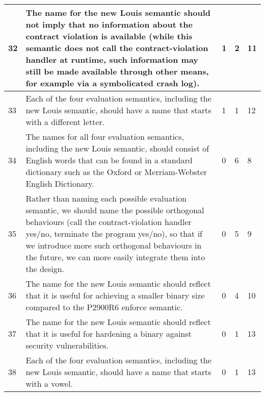 \begin{longtable}{|p{0.8cm}|p{11.5cm}|p{0.6cm}|p{0.6cm}|p{0.6cm}|}
32 & The name for the new Louis semantic should not imply that no information about the contract violation is available (while this semantic does not call the contract-violation handler at runtime, such information may still be made available through other means, for example via a symbolicated crash log). & 1 & 2 & 11 \\ \hline
33 & Each of the four evaluation semantics, including the new Louis semantic, should have a name that starts with a different letter. & 1 & 1 & 12 \\ \hline
34 & The names for all four evaluation semantics, including the new Louis semantic, should consist of English words that can be found in a standard dictionary such as the Oxford or Merriam-Webster English Dictionary. & 0 & 6 & 8 \\ \hline
35 & Rather than naming each possible evaluation semantic, we should name the possible orthogonal behaviours (call the contract-violation handler yes/no, terminate the program yes/no), so that if we introduce more such orthogonal behaviours in the future, we can more easily integrate them into the design. & 0 & 5 & 9 \\ \hline
36 & The name for the new Louis semantic should reflect that it is useful for achieving a smaller binary size compared to the P2900R6 enforce semantic. & 0 & 4 & 10 \\ \hline
37 & The name for the new Louis semantic should reflect that it is useful for hardening a binary against security vulnerabilities. & 0 & 1 & 13 \\ \hline
38 & Each of the four evaluation semantics, including the new Louis semantic, should have a name that starts with a vowel. & 0 & 1 & 13  \\ \hline
\end{longtable}


